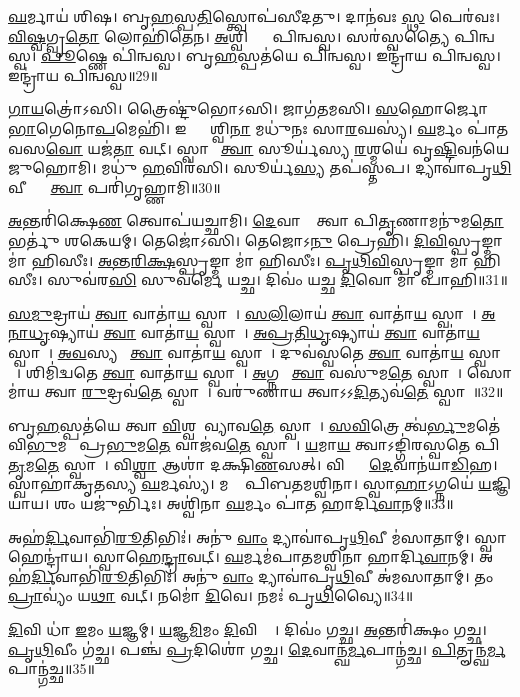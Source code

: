 \ul{𑌘}𑌰𑍍𑌮𑌾𑌯॑ 𑌶𑌿𑌷। 
𑌬𑍃\ul{𑌹}𑌸𑍍𑌪\ul{𑌤𑌿}𑌸𑍍𑌤𑍍𑌵𑍋𑌪॑𑌸𑍀𑌦𑌤𑍁। 
𑌦𑌾𑌨॑𑌵𑌃 \ul{𑌸𑍍𑌥} 𑌪𑍇𑌰॑𑌵𑌃। 
\ul{𑌵𑌿}\ul{𑌷𑍍𑌵}𑌗𑍍𑌵𑍃\ul{𑌤𑍋} 𑌲𑍋𑌹𑌿॑𑌤𑍇𑌨। 
\ul{𑌅}𑌶𑍍𑌵𑌿𑌭𑍍𑌯𑌾𑌂᳚ 𑌪𑌿𑌨𑍍𑌵𑌸𑍍𑌵। 
𑌸𑌰॑𑌸𑍍𑌵𑌤𑍍𑌯𑍈 𑌪𑌿𑌨𑍍𑌵𑌸𑍍𑌵। 
\ul{𑌪𑍂}𑌷𑍍𑌣𑍇 𑌪𑌿॑𑌨𑍍𑌵𑌸𑍍𑌵। 
𑌬𑍃\ul{𑌹}𑌸𑍍𑌪𑌤॑𑌯𑍇 𑌪𑌿𑌨𑍍𑌵𑌸𑍍𑌵। 
𑌇𑌨𑍍𑌦𑍍𑌰𑌾॑𑌯 𑌪𑌿𑌨𑍍𑌵𑌸𑍍𑌵। 
𑌇𑌨𑍍𑌦𑍍𑌰𑌾॑𑌯 𑌪𑌿𑌨𑍍𑌵𑌸𑍍𑌵॥29॥

\ul{𑌗𑌾}\ul{𑌯}𑌤𑍍𑌰𑍋॑𑌽𑌸𑌿। 
𑌤𑍍𑌰𑍈𑌷𑍍𑌟𑍁॑𑌭𑍋𑌽𑌸𑌿। 
𑌜𑌾𑌗॑𑌤𑌮𑌸𑌿। 
\ul{𑌸}𑌹𑍋𑌰𑍍𑌜𑍋 \ul{𑌭𑌾}𑌗𑍇𑌨𑍋\ul{𑌪}𑌮𑍇𑌹𑌿॑। 
𑌇𑌨𑍍𑌦𑍍𑌰𑌾᳚𑌶𑍍𑌵𑌿\ul{𑌨𑌾} 𑌮𑌧𑍁॑𑌨𑌃 𑌸𑌾\ul{𑌰}𑌘𑌸𑍍𑌯॑। 
\ul{𑌘}𑌰𑍍𑌮𑌂 𑌪𑌾॑𑌤 𑌵𑌸\ul{𑌵𑍋} 𑌯𑌜॑\ul{𑌤𑌾} 𑌵𑌟𑍍। 
𑌸𑍍𑌵𑌾𑌹𑌾᳚ \ul{𑌤𑍍𑌵𑌾} 𑌸𑍂𑌰𑍍𑌯॑𑌸𑍍𑌯 \ul{𑌰}𑌶𑍍𑌮𑌯𑍇॑ 𑌵𑍃\ul{𑌷𑍍𑌟𑌿}𑌵𑌨॑𑌯𑍇 𑌜𑍁𑌹𑍋𑌮𑌿। 
𑌮𑌧𑍁॑ \ul{𑌹}𑌵𑌿𑌰॑𑌸𑌿। 
𑌸𑍂𑌰𑍍𑌯॑\ul{𑌸𑍍𑌯} 𑌤𑌪॑𑌸𑍍𑌤𑌪। 
𑌦𑍍𑌯𑌾𑌵𑌾॑𑌪𑍃\ul{𑌥𑌿}𑌵𑍀𑌭𑍍𑌯𑌾𑌂᳚ \ul{𑌤𑍍𑌵𑌾} 𑌪𑌰𑌿॑𑌗𑍃𑌹𑍍𑌣𑌾𑌮𑌿॥30॥

\ul{𑌅}𑌨𑍍𑌤𑌰𑌿॑𑌕𑍍𑌷𑍇\ul{𑌣} 𑌤𑍍𑌵𑍋𑌪॑𑌯𑌚𑍍𑌛𑌾𑌮𑌿। 
\ul{𑌦𑍇}𑌵𑌾𑌨𑌾𑌂᳚ 𑌤𑍍𑌵𑌾 𑌪𑌿\ul{𑌤𑍃}𑌣𑌾𑌮𑌨𑍁॑𑌮\ul{𑌤𑍋} 𑌭𑌰𑍍𑌤𑍁॑ 𑌶𑌕𑍇𑌯𑌮𑍍। 
𑌤𑍇𑌜𑍋॑𑌽𑌸𑌿। 
𑌤𑍇𑌜𑍋𑌽\ul{𑌨𑍁} 𑌪𑍍𑌰𑍇𑌹𑌿॑। 
\ul{𑌦𑌿}\ul{𑌵𑌿}𑌸𑍍𑌪𑍃𑌙𑍍𑌮𑌾 𑌮𑌾॑ 𑌹𑌿𑌸𑍀𑌃। 
\ul{𑌅}\ul{𑌨𑍍𑌤}\ul{𑌰𑌿}\ul{𑌕𑍍𑌷}𑌸𑍍𑌪𑍃𑌙𑍍𑌮𑌾 𑌮𑌾॑ 𑌹𑌿𑌸𑍀𑌃। 
\ul{𑌪𑍃}\ul{𑌥𑌿}\ul{𑌵𑌿}𑌸𑍍𑌪𑍃𑌙𑍍𑌮𑌾 𑌮𑌾॑ 𑌹𑌿𑌸𑍀𑌃। 
𑌸𑍁𑌵॑𑌰\ul{𑌸𑌿} 𑌸𑍁𑌵॑𑌰𑍍𑌮𑍇 𑌯𑌚𑍍𑌛। 
𑌦𑌿𑌵𑌂॑ 𑌯𑌚𑍍𑌛 \ul{𑌦𑌿}𑌵𑍋 𑌮𑌾॑ 𑌪𑌾𑌹𑌿॥31॥
\anuvakamend[𑌏𑌹𑌿॑ 𑌪𑌾𑌹𑌿 𑌪𑌿𑌨𑍍𑌵𑌸𑍍𑌵 𑌗𑍃𑌹𑍍𑌣𑌾\ul{𑌮𑌿} 𑌨𑌵॑ 𑌚]

\ul{𑌸}\ul{𑌮𑍁}𑌦𑍍𑌰𑌾𑌯॑ \ul{𑌤𑍍𑌵𑌾} 𑌵𑌾𑌤𑌾॑\ul{𑌯} 𑌸𑍍𑌵𑌾𑌹𑌾᳚। 
\ul{𑌸}\ul{𑌲𑌿}𑌲𑌾𑌯॑ \ul{𑌤𑍍𑌵𑌾} 𑌵𑌾𑌤𑌾॑\ul{𑌯} 𑌸𑍍𑌵𑌾𑌹𑌾᳚। 
\ul{𑌅}\ul{𑌨𑌾}\ul{𑌧𑍃}𑌷𑍍𑌯𑌾𑌯॑ \ul{𑌤𑍍𑌵𑌾} 𑌵𑌾𑌤𑌾॑\ul{𑌯} 𑌸𑍍𑌵𑌾𑌹𑌾᳚। 
\ul{𑌅}\ul{𑌪𑍍𑌰}\ul{𑌤𑌿}\ul{𑌧𑍃}𑌷𑍍𑌯𑌾𑌯॑ \ul{𑌤𑍍𑌵𑌾} 𑌵𑌾𑌤𑌾॑\ul{𑌯} 𑌸𑍍𑌵𑌾𑌹𑌾᳚। 
\ul{𑌅}\ul{𑌵}𑌸𑍍𑌯𑌵𑍇᳚ \ul{𑌤𑍍𑌵𑌾} 𑌵𑌾𑌤𑌾॑\ul{𑌯} 𑌸𑍍𑌵𑌾𑌹𑌾᳚। 
𑌦𑍁𑌵॑𑌸𑍍𑌵𑌤𑍇 \ul{𑌤𑍍𑌵𑌾} 𑌵𑌾𑌤𑌾॑\ul{𑌯} 𑌸𑍍𑌵𑌾𑌹𑌾᳚। 
𑌶𑌿𑌮𑌿॑𑌦𑍍𑌵𑌤𑍇 \ul{𑌤𑍍𑌵𑌾} 𑌵𑌾𑌤𑌾॑\ul{𑌯} 𑌸𑍍𑌵𑌾𑌹𑌾᳚। 
\ul{𑌅}𑌗𑍍𑌨𑌯𑍇᳚ \ul{𑌤𑍍𑌵𑌾} 𑌵𑌸𑍁॑𑌮\ul{𑌤𑍇} 𑌸𑍍𑌵𑌾𑌹𑌾᳚। 
𑌸𑍋𑌮𑌾॑𑌯 𑌤𑍍𑌵𑌾 \ul{𑌰𑍁}𑌦𑍍𑌰𑌵॑\ul{𑌤𑍇} 𑌸𑍍𑌵𑌾𑌹𑌾᳚। 
𑌵𑌰𑍁॑𑌣𑌾𑌯 𑌤𑍍𑌵𑌾𑌽𑌽\ul{𑌦𑌿}𑌤𑍍𑌯𑌵॑\ul{𑌤𑍇} 𑌸𑍍𑌵𑌾𑌹𑌾᳚॥32॥

𑌬𑍃\ul{𑌹}𑌸𑍍𑌪𑌤॑𑌯𑍇 𑌤𑍍𑌵𑌾 \ul{𑌵𑌿}𑌶𑍍𑌵𑌦𑍇᳚𑌵𑍍𑌯𑌾𑌵\ul{𑌤𑍇} 𑌸𑍍𑌵𑌾𑌹𑌾᳚। 
\ul{𑌸}\ul{𑌵𑌿}𑌤𑍍𑌰𑍇 𑌤𑍍𑌵॑\ul{𑌰𑍍𑌭𑍁}𑌮𑌤𑍇॑ 𑌵𑌿\ul{𑌭𑍁}𑌮𑌤𑍇᳚ 𑌪𑍍𑌰\ul{𑌭𑍁}𑌮\ul{𑌤𑍇} 𑌵𑌾𑌜॑𑌵\ul{𑌤𑍇} 𑌸𑍍𑌵𑌾𑌹𑌾᳚। 
\ul{𑌯}𑌮𑌾\ul{𑌯} 𑌤𑍍𑌵𑌾𑌽𑌙𑍍𑌗𑌿॑𑌰𑌸𑍍𑌵𑌤𑍇 𑌪𑌿\ul{𑌤𑍃}𑌮\ul{𑌤𑍇} 𑌸𑍍𑌵𑌾𑌹𑌾᳚। 
𑌵𑌿\ul{𑌶𑍍𑌵𑌾} 𑌆𑌶𑌾॑ 𑌦𑌕𑍍𑌷𑌿\ul{𑌣}𑌸𑌤𑍍। 
𑌵𑌿𑌶𑍍𑌵𑌾𑌂᳚ \ul{𑌦𑍇}𑌵𑌾𑌨॑𑌯𑌾\ul{𑌡𑌿}𑌹। 
𑌸𑍍𑌵𑌾𑌹𑌾॑𑌕𑍃𑌤𑌸𑍍𑌯 \ul{𑌘}𑌰𑍍𑌮𑌸𑍍𑌯॑। 
𑌮𑌧𑍋𑌃᳚ 𑌪𑌿𑌬𑌤𑌮𑌶𑍍𑌵𑌿𑌨𑌾। 
𑌸𑍍𑌵𑌾\ul{𑌹𑌾}𑌽𑌗𑍍𑌨𑌯𑍇॑ \ul{𑌯}𑌜𑍍𑌞𑌿𑌯𑌾॑𑌯। 
𑌶𑌂 𑌯𑌜𑍁॑𑌰𑍍𑌭𑌿𑌃। 
𑌅𑌶𑍍𑌵𑌿॑𑌨𑌾 \ul{𑌘}𑌰𑍍𑌮𑌂 𑌪𑌾॑𑌤 𑌹𑌾𑌰𑍍𑌦𑌿\ul{𑌵𑌾}𑌨𑌮𑍍॥33॥

𑌅𑌹॑\ul{𑌰𑍍𑌦𑌿}𑌵𑌾𑌭𑌿॑\ul{𑌰𑍂}𑌤𑌿𑌭𑌿𑌃॑। 
𑌅𑌨𑍁॑ \ul{𑌵𑌾𑌂} 𑌦𑍍𑌯𑌾𑌵𑌾॑𑌪𑍃\ul{𑌥𑌿}𑌵𑍀 𑌮॑𑌸𑌾𑌤𑌾𑌮𑍍। 
𑌸𑍍𑌵𑌾𑌹𑍇𑌨𑍍𑌦𑍍𑌰𑌾॑𑌯। 
𑌸𑍍𑌵𑌾𑌹𑍇\ul{𑌨𑍍𑌦𑍍𑌰𑌾}𑌵𑌟𑍍। 
\ul{𑌘}𑌰𑍍𑌮𑌮॑𑌪𑌾𑌤𑌮𑌶𑍍𑌵𑌿𑌨𑌾 𑌹𑌾𑌰𑍍𑌦𑌿\ul{𑌵𑌾}𑌨𑌮𑍍। 
𑌅𑌹॑\ul{𑌰𑍍𑌦𑌿}𑌵𑌾𑌭𑌿॑\ul{𑌰𑍂}𑌤𑌿𑌭𑌿𑌃॑। 
𑌅𑌨𑍁॑ \ul{𑌵𑌾𑌂} 𑌦𑍍𑌯𑌾𑌵𑌾॑𑌪𑍃\ul{𑌥𑌿}𑌵𑍀 𑌅॑𑌮𑌸𑌾𑌤𑌾𑌮𑍍। 
𑌤𑌂 \ul{𑌪𑍍𑌰𑌾}𑌵𑍍𑌯𑌂॑ 𑌯\ul{𑌥𑌾} 𑌵𑌟𑍍। 
𑌨𑌮𑍋॑ \ul{𑌦𑌿}𑌵𑍇। 
𑌨𑌮𑌃॑ 𑌪𑍃\ul{𑌥𑌿}𑌵𑍍𑌯𑍈॥34॥

\ul{𑌦𑌿}𑌵𑌿 𑌧𑌾॑ \ul{𑌇}𑌮𑌂 \ul{𑌯}𑌜𑍍𑌞𑌮𑍍। 
\ul{𑌯}𑌜𑍍𑌞\ul{𑌮𑌿}𑌮𑌂 \ul{𑌦𑌿}𑌵𑌿 𑌧𑌾𑌃᳚। 
𑌦𑌿𑌵𑌂॑ 𑌗𑌚𑍍𑌛। 
\ul{𑌅}𑌨𑍍𑌤𑌰𑌿॑𑌕𑍍𑌷𑌂 𑌗𑌚𑍍𑌛। 
\ul{𑌪𑍃}\ul{𑌥𑌿}𑌵𑍀𑌂 𑌗॑𑌚𑍍𑌛। 
𑌪𑌞𑍍𑌚॑ \ul{𑌪𑍍𑌰}𑌦𑌿𑌶𑍋॑ 𑌗𑌚𑍍𑌛। 
\ul{𑌦𑍇}𑌵𑌾𑌨𑍍𑌘॑\ul{𑌰𑍍𑌮}𑌪𑌾𑌨𑍍𑌗॑𑌚𑍍𑌛। 
\ul{𑌪𑌿}𑌤𑍄𑌨𑍍𑌘॑\ul{𑌰𑍍𑌮}𑌪𑌾𑌨𑍍𑌗॑𑌚𑍍𑌛॥35॥
\anuvakamend[\ul{𑌆}\ul{𑌦𑌿}𑌤𑍍𑌯𑌵॑\ul{𑌤𑍇} 𑌸𑍍𑌵𑌾𑌹𑌾॑ 𑌹𑌾𑌰𑍍𑌦𑌿\ul{𑌵𑌾}𑌨𑌂 𑌪𑍃॑\ul{𑌥𑌿}𑌵𑍍𑌯𑌾 \ul{𑌅}𑌷𑍍𑌟𑍗 𑌚॑]

